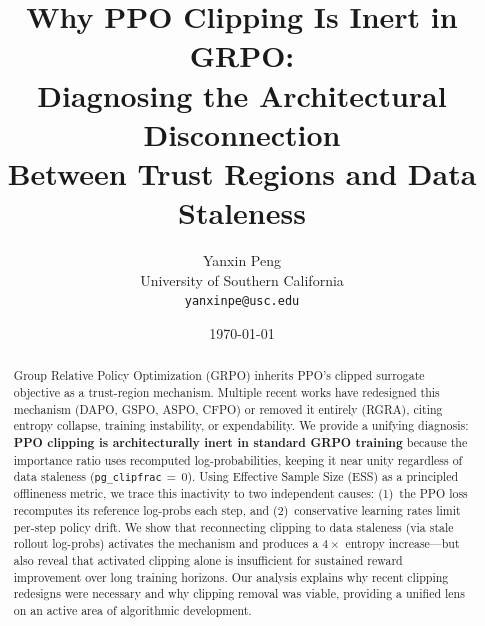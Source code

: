 \documentclass[11pt]{article}
\title{Why PPO Clipping Is Inert in GRPO:\\
Diagnosing the Architectural Disconnection\\
Between Trust Regions and Data Staleness}
\author{
  Yanxin Peng \\
  University of Southern California \\
  \texttt{yanxinpe@usc.edu}
}
\date{\today}
\begin{document}
\maketitle

\begin{abstract}
Group Relative Policy Optimization (GRPO) inherits PPO's clipped surrogate objective as a trust-region mechanism.
Multiple recent works have redesigned this mechanism (DAPO, GSPO, ASPO, CFPO) or removed it entirely (RGRA), citing entropy collapse, training instability, or expendability.
We provide a unifying diagnosis: \textbf{PPO clipping is architecturally inert in standard GRPO training} because the importance ratio uses recomputed log-probabilities, keeping it near unity regardless of data staleness (\texttt{pg\_clipfrac}$\,{=}\,0$).
Using Effective Sample Size (ESS) as a principled offlineness metric, we trace this inactivity to two independent causes: (1)~the PPO loss recomputes its reference log-probs each step, and (2)~conservative learning rates limit per-step policy drift.
We show that reconnecting clipping to data staleness (via stale rollout log-probs) activates the mechanism and produces a $4\times$ entropy increase---but also reveal that activated clipping alone is insufficient for sustained reward improvement over long training horizons.
Our analysis explains why recent clipping redesigns were necessary and why clipping removal was viable, providing a unified lens on an active area of algorithmic development.
\end{abstract}





% 
% 
\end{document}
